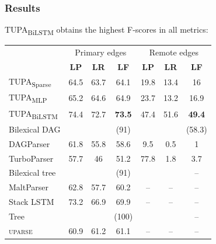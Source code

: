 \documentclass[t,xcolor={svgnames}]{beamer}
\newcommand{\parser}[1]{TUPA\textsubscript{#1}}
\begin{document}
\begin{frame}
\frametitle{Results}
\parser{BiLSTM} obtains the highest F-scores in all metrics:
\begin{center}
    \begin{tabular}{l|ccc|ccc}
        & \multicolumn{3}{c|}{Primary edges} & \multicolumn{3}{c}{Remote edges} \\
        & \textbf{LP} & \textbf{LR} & \textbf{LF} & \textbf{LP} & \textbf{LR} & \textbf{LF} \\
        \hline
        \parser{Sparse}
        & 64.5 & 63.7 & 64.1 & 19.8 & 13.4 & 16 \\
        \parser{MLP}
        & 65.2 & 64.6 & 64.9 & 23.7 & 13.2 & 16.9 \\
        \parser{BiLSTM}
        & 74.4 & 72.7 & \textbf{73.5} & 47.4 & 51.6 & \textbf{49.4} \\
        \hline
        \scriptsize Bilexical DAG
        & & & \scriptsize (91) & & & \scriptsize (58.3) \\
    	DAGParser
        & 61.8 & 55.8 & 58.6 & 9.5 & 0.5 & 1 \\
    	TurboParser
        & 57.7 & 46 & 51.2 & 77.8 & 1.8 & 3.7 \\
        \hline
        \scriptsize Bilexical tree
        & & & \scriptsize (91) & & & \scriptsize -- \\
    	MaltParser
        & 62.8 & 57.7 & 60.2 & -- & -- & -- \\
    	Stack LSTM
        & 73.2 & 66.9 & 69.9 & -- & -- & -- \\
        \hline
        \scriptsize Tree
        & & & \scriptsize (100) & & & \scriptsize -- \\
        \textsc{uparse}
        & 60.9 & 61.2 & 61.1 & -- & -- & --
    \end{tabular}
\end{center}
\end{frame}
\end{document}

